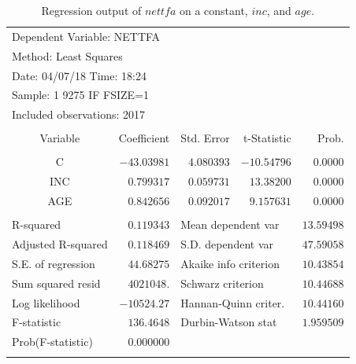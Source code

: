 \documentclass[12pt]{report}
\begin{document}
\begin{table}[H]
	\centering
	\begin{tabular}{lrrrr}
		\multicolumn{3}{l}{Dependent Variable: NETTFA}&\multicolumn{1}{c}{}&\multicolumn{1}{c}{}\\
		\multicolumn{3}{l}{Method: Least Squares}&\multicolumn{1}{c}{}&\multicolumn{1}{c}{}\\
		\multicolumn{3}{l}{Date: 04/07/18   Time: 18:24}&\multicolumn{1}{c}{}&\multicolumn{1}{c}{}\\
		\multicolumn{3}{l}{Sample: 1 9275 IF FSIZE=1}&\multicolumn{1}{c}{}&\multicolumn{1}{c}{}\\
		\multicolumn{3}{l}{Included observations: 2017}&\multicolumn{1}{c}{}&\multicolumn{1}{c}{}\\
		[4.5pt] \hline \\ [-4.5pt]
		\multicolumn{1}{c}{Variable}&\multicolumn{1}{r}{Coefficient}&\multicolumn{1}{r}{Std. Error}&\multicolumn{1}{r}{t-Statistic}&\multicolumn{1}{r}{Prob.}\\
		[4.5pt] \hline \\ [-4.5pt]
		\multicolumn{1}{c}{C}&\multicolumn{1}{r}{$-43.03981$}&\multicolumn{1}{r}{$4.080393$}&\multicolumn{1}{r}{$-10.54796$}&\multicolumn{1}{r}{$0.0000$}\\
		\multicolumn{1}{c}{INC}&\multicolumn{1}{r}{$0.799317$}&\multicolumn{1}{r}{$0.059731$}&\multicolumn{1}{r}{$13.38200$}&\multicolumn{1}{r}{$0.0000$}\\
		\multicolumn{1}{c}{AGE}&\multicolumn{1}{r}{$0.842656$}&\multicolumn{1}{r}{$0.092017$}&\multicolumn{1}{r}{$9.157631$}&\multicolumn{1}{r}{$0.0000$}\\
		[4.5pt] \hline \\ [-4.5pt]
		\multicolumn{1}{l}{R-squared}&\multicolumn{1}{r}{$0.119343$}&\multicolumn{2}{l}{Mean dependent var}&\multicolumn{1}{r}{$13.59498$}\\
		\multicolumn{1}{l}{Adjusted R-squared}&\multicolumn{1}{r}{$0.118469$}&\multicolumn{2}{l}{S.D. dependent var}&\multicolumn{1}{r}{$47.59058$}\\
		\multicolumn{1}{l}{S.E. of regression}&\multicolumn{1}{r}{$44.68275$}&\multicolumn{2}{l}{Akaike info criterion}&\multicolumn{1}{r}{$10.43854$}\\
		\multicolumn{1}{l}{Sum squared resid}&\multicolumn{1}{r}{$4021048.$}&\multicolumn{2}{l}{Schwarz criterion}&\multicolumn{1}{r}{$10.44688$}\\
		\multicolumn{1}{l}{Log likelihood}&\multicolumn{1}{r}{$-10524.27$}&\multicolumn{2}{l}{Hannan-Quinn criter.}&\multicolumn{1}{r}{$10.44160$}\\
		\multicolumn{1}{l}{F-statistic}&\multicolumn{1}{r}{$136.4648$}&\multicolumn{2}{l}{Durbin-Watson stat}&\multicolumn{1}{r}{$1.959509$}\\
		\multicolumn{1}{l}{Prob(F-statistic)}&\multicolumn{1}{r}{$0.000000$}&\multicolumn{1}{c}{}&\multicolumn{1}{c}{}&\multicolumn{1}{c}{}\\
		[4.5pt] \hline \\ [-4.5pt]
	\end{tabular}
	\caption{Regression output of $nettfa$ on a constant, $inc$, and $age$.}
\end{table}
\end{document}
